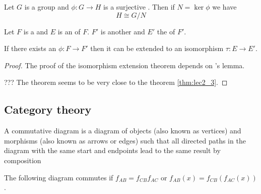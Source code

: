 \begin{appendices}
\begin{theorem}
  Let $G$ is a group and $\phi: G \to H$ is a
  surjective . Then if $N = \ker \phi$ we
  have
  \[
  H \cong G/N
  \]
  \label{thm:firstisomorphism}
\end{theorem}

\begin{theorem}
  Let $F$ is a  and $E$ is an
   of $F$.
  $F'$ is another  and $E'$ the 
   of $F'$.

  If there exists an  $\phi: F \to F'$ then
  it can be extended to an isomorphism $\tau: E \to E'$.

  \begin{proof}
    The proof of the isomorphism extension theorem depends on
    's lemma.

    ??? The theorem seems to be very close to the theorem
    \ref{thm:lec2_3}. 
  \end{proof}
  
  \label{thm:isomorphismextension}
\end{theorem}

\subsection{Category theory}

\begin{definition}
  A commutative diagram is a diagram of objects (also known as
  vertices) and morphisms (also known as arrows or edges) such that
  all directed paths in the diagram with the same start and endpoints
  lead to the same result by composition
  \label{def:commutativediagram}

  The following diagram commutes if $f_{AB} = f_{CB} f_{AC}$ or
  $f_{AB}\left(x\right) = f_{CB} \left(f_{AC}\left(x\right)\right)$.


\end{definition}
\end{appendices}
